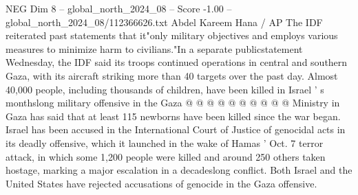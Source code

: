 \begin{textsample}{NEG Dim 8 – global\_north\_2024\_08 – Score -1.00 – global\_north\_2024\_08/112366626.txt}
Abdel Kareem Hana / AP The IDF reiterated past statements that it"only military objectives and employs various measures to minimize harm to civilians."In a separate publicstatement Wednesday, the IDF said its troops continued operations in central and southern Gaza, with its aircraft striking more than 40 targets over the past day.
Almost 40,000 people, including thousands of children, have been killed in Israel ' s monthslong military offensive in the Gaza @ @ @ @ @ @ @ @ @ @ Ministry in Gaza has said that at least 115 newborns have been killed since the war began.
Israel has been accused in the International Court of Justice of genocidal acts in its deadly offensive, which it launched in the wake of Hamas ' Oct. 7 terror attack, in which some 1,200 people were killed and around 250 others taken hostage, marking a major escalation in a decadeslong conflict.
Both Israel and the United States have rejected accusations of genocide in the Gaza offensive.

\end{textsample}
